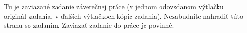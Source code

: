 Tu je zaviazané zadanie  záverečnej práce (v jednom odovzdanom výtlačku originál zadania, v ďalších výtlačkoch kópie zadania). Nezabudnite nahradiť túto stranu so zadaním. Zaviazať zadanie do práce je povinné.

\cleardoublepage

	

